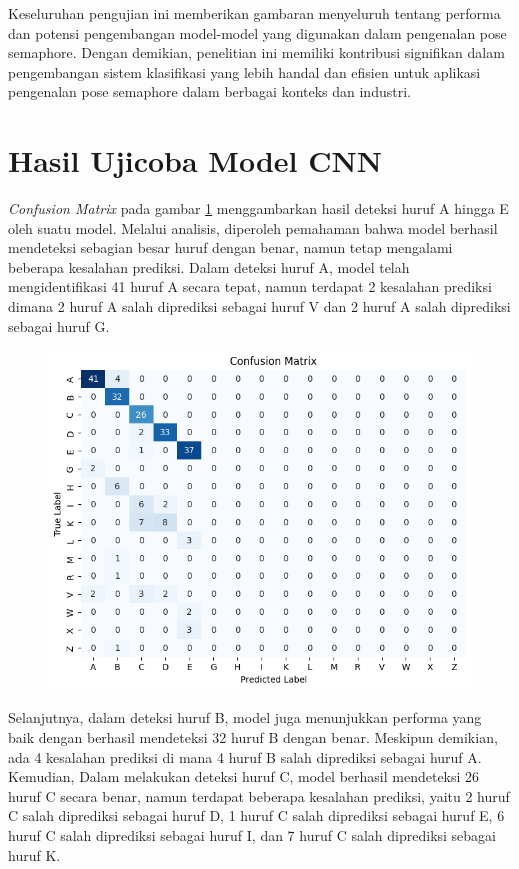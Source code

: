Keseluruhan pengujian ini memberikan gambaran menyeluruh tentang performa dan potensi pengembangan model-model yang digunakan dalam pengenalan pose semaphore. Dengan demikian, penelitian ini memiliki kontribusi signifikan dalam pengembangan sistem klasifikasi yang lebih handal dan efisien untuk aplikasi pengenalan pose semaphore dalam berbagai konteks dan industri.

\section{Hasil Ujicoba Model CNN}
\textit{Confusion Matrix} pada gambar \ref{fig:HasilUjicobaCNN} menggambarkan hasil deteksi huruf A hingga E oleh suatu model. Melalui analisis, diperoleh pemahaman bahwa model berhasil mendeteksi sebagian besar huruf dengan benar, namun tetap mengalami beberapa kesalahan prediksi. Dalam deteksi huruf A, model telah mengidentifikasi 41 huruf A secara tepat, namun terdapat 2 kesalahan prediksi dimana 2 huruf A salah diprediksi sebagai huruf V dan 2 huruf A salah diprediksi sebagai huruf G.

\begin{figure}[!hbt]
	\centering
	\includegraphics[width=0.7\linewidth]{gambar/bener/ConfusionMatrix-Ujicoba-CNN.png}
	\label{fig:HasilUjicobaCNN}
\end{figure}

Selanjutnya, dalam deteksi huruf B, model juga menunjukkan performa yang baik dengan berhasil mendeteksi 32 huruf B dengan benar. Meskipun demikian, ada 4 kesalahan prediksi di mana 4 huruf B salah diprediksi sebagai huruf A. Kemudian, Dalam melakukan deteksi huruf C, model berhasil mendeteksi 26 huruf C secara benar, namun terdapat beberapa kesalahan prediksi, yaitu 2 huruf C salah diprediksi sebagai huruf D, 1 huruf C salah diprediksi sebagai huruf E, 6 huruf C salah diprediksi sebagai huruf I, dan 7 huruf C salah diprediksi sebagai huruf K.

